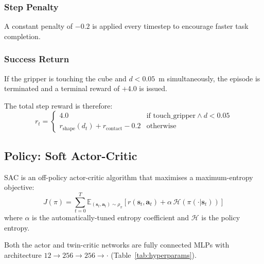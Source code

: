 \documentclass[conference]{IEEEtran}
\begin{document}
\subsubsection{Step Penalty}

A constant penalty of $-0.2$ is applied every timestep to
encourage faster task completion.

\subsubsection{Success Return}

If the gripper is touching the cube and $d < 0.05$~m simultaneously,
the episode is terminated and a terminal reward of $+4.0$ is issued.

The total step reward is therefore:
\begin{equation}
    r_t =
    \begin{cases}
        4.0 & \text{if touch\_gripper} \wedge d < 0.05 \\
        r_\text{shape}(d_t) + r_\text{contact} - 0.2 & \text{otherwise}
    \end{cases}
    \label{eq:reward}
\end{equation}

\subsection{Policy: Soft Actor-Critic}

SAC \cite{haarnoja2018sac} is an off-policy actor-critic algorithm
that maximises a maximum-entropy objective:
\begin{equation}
    J(\pi) = \sum_{t=0}^{T}
    \mathbb{E}_{(\mathbf{s}_t,\mathbf{a}_t)\sim\rho_\pi}
    \!\left[ r(\mathbf{s}_t, \mathbf{a}_t)
    + \alpha\,\mathcal{H}(\pi(\cdot|\mathbf{s}_t)) \right]
\end{equation}
where $\alpha$ is the automatically-tuned entropy coefficient and
$\mathcal{H}$ is the policy entropy.

Both the actor and twin-critic networks are fully connected MLPs
with architecture $12 \to 256 \to 256 \to \cdot$
(Table~\ref{tab:hyperparams}).
\end{document}
